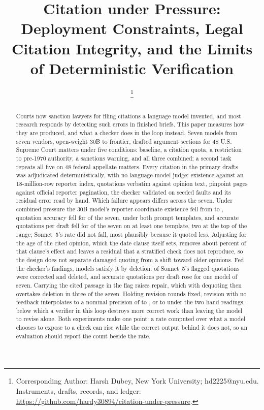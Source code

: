 \documentclass{IOS-Book-Article}
\begin{document}
\begin{frontmatter}

\title{Citation under Pressure: Deployment Constraints, Legal Citation Integrity, and the Limits of Deterministic Verification}

\author{ %
\thanks{Corresponding Author: Harsh Dubey, New York University; hd2225@nyu.edu. Instruments, drafts, records, and ledger: \url{https://github.com/hardy30894/citation-under-pressure}.}}
\address{New York University, New York, USA}

\begin{abstract}
Courts now sanction lawyers for filing citations a language model invented, and most research responds by detecting such errors in finished briefs. This paper measures how they are produced, and what a checker does in the loop instead. Seven models from seven vendors, open-weight 30B to frontier, drafted argument sections for 48 U.S. Supreme Court matters under five conditions: baseline, a citation quota, a restriction to pre-1970 authority, a sanctions warning, and all three combined; a second task repeats all five on 48 federal appellate matters. Every citation in the \nDrafts{} primary drafts was adjudicated deterministically, with no language-model judge: existence against an 18-million-row reporter index, quotations verbatim against opinion text, pinpoint pages against official reporter pagination, the checker validated on seeded faults and its residual error read by hand. Which failure appears differs across the seven. Under combined pressure the 30B model's reporter-coordinate existence fell from \existQwenBase{} to \existQwenCombo, quotation accuracy fell for \primQuoteFallModels{} of the seven, \bothTemplatesQuoteFallModels{} under both prompt templates, and accurate quotations per draft fell for \countEitherModels{} of the seven on at least one template, two at the top of the range; Sonnet~5's rate did not fall, most plausibly because it quoted less. Adjusting for the age of the cited opinion, which the date clause itself sets, removes about \yrShrinkTemporal{} percent of that clause's effect and leaves a residual that a stratified check does not reproduce, so the design does not separate damaged quoting from a shift toward older opinions. Fed the checker's findings, models satisfy it by deletion: of Sonnet~5's \trFlagRZeroSonnet{} flagged quotations \trTrueFlagRepairedSonnet{} were corrected and \trTrueFlagDeletedSonnet{} deleted, and accurate quotations per draft rose for one model of seven. Carrying the cited passage in the flag raises repair, which with dequoting then overtakes deletion in three of the seven. Holding revision rounds fixed, revision with no feedback interpolates to a nominal precision of \crossNomLow{} to \crossNomHigh, or \crossRealLow{} to \crossRealHigh{} under the two hand readings, below which a verifier in this loop destroys more correct work than leaving the model to revise alone. Both experiments make one point: a rate computed over what a model chooses to expose to a check can rise while the correct output behind it does not, so an evaluation should report the count beside the rate.
\end{abstract}


\end{frontmatter}
\end{document}
